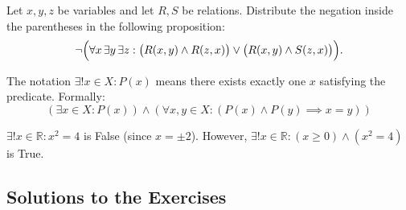\begin{exercise}
\label{exc:logic_distribute_negation}
Let $x, y, z$ be variables and let $R, S$ be relations. Distribute the negation inside the parentheses in the following proposition:
\[
\neg \Bigl( \forall x \, \exists y \, \exists z : \bigl( R(x, y) \wedge R(z, x) \bigr) \vee \bigl( R(x, y) \wedge S(z, x) \bigr) \Bigr).
\]
\end{exercise}

\begin{definition}
\label{def:unique_existence}
The notation $\exists! x \in X : P(x)$ means there exists exactly one $x$ satisfying the predicate. Formally:
\[
(\exists x \in X : P(x)) \wedge (\forall x, y \in X : (P(x) \wedge P(y) \implies x = y))
\]
\end{definition}

\begin{example}
\label{ex:unique_existence_roots}
$\exists! x \in \mathbb{R} : x^2 = 4$ is False (since $x = \pm 2$). However, $\exists! x \in \mathbb{R} : (x \ge 0) \wedge (x^2 = 4)$ is True.
\end{example}

\subsection{Solutions to the Exercises}
\label{sec:solutions_logic}

